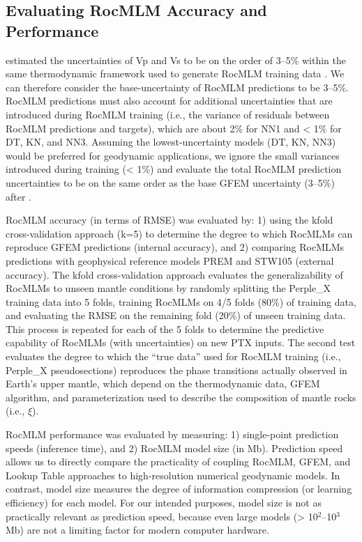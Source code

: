 \documentclass[draft,linenumbers]{agujournal2018}
\begin{document}
\subsection{Evaluating RocMLM Accuracy and Performance}\label{sec:evaluate-rocmlms}

\citet{connolly2016} estimated the uncertainties of Vp and Vs to be on the order of 3--5\% within the same thermodynamic framework used to generate RocMLM training data \citep{stixrude2005}. We can therefore consider the base-uncertainty of RocMLM predictions to be 3--5\%. RocMLM predictions must also account for additional uncertainties that are introduced during RocMLM training (i.e., the variance of residuals between RocMLM predictions and targets), which are about 2\% for NN1 and \textless{} 1\% for DT, KN, and NN3. Assuming the lowest-uncertainty models (DT, KN, NN3) would be preferred for geodynamic applications, we ignore the small variances introduced during training (\textless{} 1\%) and evaluate the total RocMLM prediction uncertainties to be on the same order as the base GFEM uncertainty (3--5\%) after \citet{connolly2016}.

RocMLM accuracy (in terms of RMSE) was evaluated by: 1) using the kfold cross-validation approach (k=5) to determine the degree to which RocMLMs can reproduce GFEM predictions (internal accuracy), and 2) comparing RocMLMs predictions with geophysical reference models PREM and STW105 (external accuracy). The kfold cross-validation approach evaluates the generalizability of RocMLMs to unseen mantle conditions by randomly splitting the Perple\_X training data into 5 folds, training RocMLMs on 4/5 folds (80\%) of training data, and evaluating the RMSE on the remaining fold (20\%) of unseen training data. This process is repeated for each of the 5 folds to determine the predictive capability of RocMLMs (with uncertainties) on new PTX inputs. The second test evaluates the degree to which the ``true data'' used for RocMLM training (i.e., Perple\_X pseudosections) reproduces the phase transitions actually observed in Earth's upper mantle, which depend on the thermodynamic data, GFEM algorithm, and parameterization used to describe the composition of mantle rocks (i.e., \(\xi\)).

RocMLM performance was evaluated by measuring: 1) single-point prediction speeds (inference time), and 2) RocMLM model size (in Mb). Prediction speed allows us to directly compare the practicality of coupling RocMLM, GFEM, and Lookup Table approaches to high-resolution numerical geodynamic models. In contrast, model size measures the degree of information compression (or learning efficiency) for each model. For our intended purposes, model size is not as practically relevant as prediction speed, because even large models (\textgreater{} 10\(^2\)--10\(^3\) Mb) are not a limiting factor for modern computer hardware.
\end{document}
